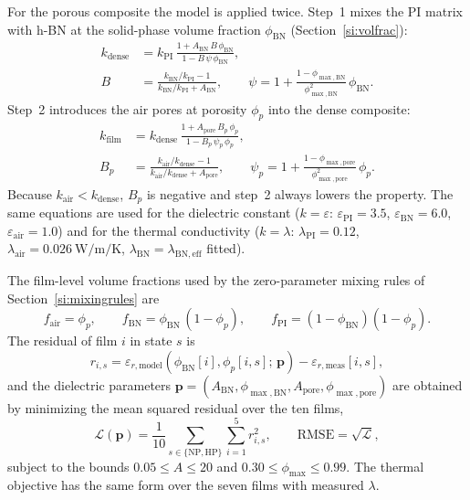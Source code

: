 \documentclass[10pt,a4paper]{article}
\newcommand{\lam}{\ensuremath{\lambda}}
\newcommand{\Apore}{\ensuremath{A_{\mathrm{pore}}}}
\newcommand{\ABN}{\ensuremath{A_{\mathrm{BN}}}}
\newcommand{\lamBN}{\ensuremath{\lambda_{\mathrm{BN,eff}}}}
\newcommand{\phimax}{\ensuremath{\phi_{\max}}}
\newcommand{\phiBN}{\ensuremath{\phi_{\mathrm{BN}}}}
\begin{document}
For the porous composite the model is applied twice. Step~1 mixes the PI matrix with h-BN at the solid-phase volume fraction \phiBN{} (Section~\ref{si:volfrac}):
\begin{equation}
\begin{aligned}
k_{\mathrm{dense}} &= k_{\mathrm{PI}}\,\frac{1 + \ABN\,B\,\phiBN}{1 - B\,\psi\,\phiBN}, \\
B &= \frac{k_{\mathrm{BN}}/k_{\mathrm{PI}} - 1}{k_{\mathrm{BN}}/k_{\mathrm{PI}} + \ABN}, \qquad
\psi = 1 + \frac{1-\phi_{\max,\mathrm{BN}}}{\phi_{\max,\mathrm{BN}}^{2}}\,\phiBN .
\end{aligned}
\label{eq:S4}
\end{equation}
Step~2 introduces the air pores at porosity $\phi_p$ into the dense composite:
\begin{equation}
\begin{aligned}
k_{\mathrm{film}} &= k_{\mathrm{dense}}\,\frac{1 + \Apore\,B_p\,\phi_p}{1 - B_p\,\psi_p\,\phi_p}, \\
B_p &= \frac{k_{\mathrm{air}}/k_{\mathrm{dense}} - 1}{k_{\mathrm{air}}/k_{\mathrm{dense}} + \Apore}, \qquad
\psi_p = 1 + \frac{1-\phi_{\max,\mathrm{pore}}}{\phi_{\max,\mathrm{pore}}^{2}}\,\phi_p .
\end{aligned}
\label{eq:S5}
\end{equation}
Because $k_{\mathrm{air}} < k_{\mathrm{dense}}$, $B_p$ is negative and step~2 always lowers the property. The same equations are used for the dielectric constant ($k = \varepsilon$: $\varepsilon_{\mathrm{PI}} = 3.5$, $\varepsilon_{\mathrm{BN}} = 6.0$, $\varepsilon_{\mathrm{air}} = 1.0$) and for the thermal conductivity ($k = \lambda$: $\lambda_{\mathrm{PI}} = 0.12$, $\lambda_{\mathrm{air}} = \SI{0.026}{\watt\per\meter\per\kelvin}$, $\lambda_{\mathrm{BN}} = \lamBN$ fitted).

The film-level volume fractions used by the zero-parameter mixing rules of Section~\ref{si:mixingrules} are
\begin{equation}
f_{\mathrm{air}} = \phi_p, \qquad f_{\mathrm{BN}} = \phiBN\,(1 - \phi_p), \qquad f_{\mathrm{PI}} = (1 - \phiBN)(1 - \phi_p).
\label{eq:S6}
\end{equation}
The residual of film $i$ in state $s$ is
\begin{equation}
r_{i,s} = \varepsilon_{r,\mathrm{model}}(\phiBN[i], \phi_{p}[i,s];\,\mathbf{p}) - \varepsilon_{r,\mathrm{meas}}[i,s],
\label{eq:S7}
\end{equation}
and the dielectric parameters $\mathbf{p} = (\ABN, \phi_{\max,\mathrm{BN}}, \Apore, \phi_{\max,\mathrm{pore}})$ are obtained by minimizing the mean squared residual over the ten films,
\begin{equation}
\mathcal{L}(\mathbf{p}) = \frac{1}{10}\sum_{s \in \{\mathrm{NP},\mathrm{HP}\}}\sum_{i=1}^{5} r_{i,s}^{2}, \qquad \mathrm{RMSE} = \sqrt{\mathcal{L}} ,
\label{eq:S8}
\end{equation}
subject to the bounds $0.05 \le A \le 20$ and $0.30 \le \phimax \le 0.99$. The thermal objective has the same form over the seven films with measured \lam.
\end{document}
